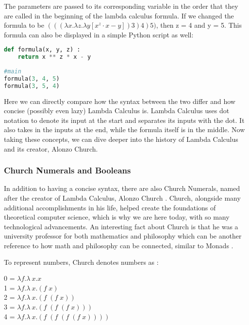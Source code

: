 \documentclass{article}
\begin{document}
\noindent
The parameters are passed to its corresponding variable in the order that they are called in the beginning of the lambda calculus formula. If we changed the formula to be $(((\lambda x.\lambda z.\lambda y [x^z \cdot x-y])3)4)5)$, then z = 4 and y = 5. This formula can also be displayed in a simple Python script as well:

\begin{lstlisting}[language=Python]
def formula(x, y, z) :
    return x ** z * x - y
    
#main
formula(3, 4, 5)
formula(3, 5, 4)
\end{lstlisting}

\noindent
Here we can directly compare how the syntax between the two differ and how concise (possibly even lazy) Lambda Calculus is. Lambda Calculus uses dot notation to denote its input at the start and separates its inputs with the dot. It also takes in the inputs at the end, while the formula itself is in the middle. Now taking these concepts, we can dive deeper into the history of Lambda Calculus and its creator, Alonzo Church.

\subsubsection{Church Numerals and Booleans}

In addition to having a concise syntax, there are also Church Numerals, named after the creator of Lambda Calculus, Alonzo Church \cite{Lambda Calculus}. Church, alongside many additional accomplishments in his life, helped create the foundations of theoretical computer science, which is why we are here today, with so many technological advancements. An interesting fact about Church is that he was a university professor for both mathematics and philosophy which can be another reference to how math and philosophy can be connected, similar to Monads \cite{NAS}.  

\medskip\noindent
To represent numbers, Church denotes numbers as \cite{CN}:

\begin{center}
    0 = $\lambda f. \lambda\ x.x$ \\
    1 = $\lambda f. \lambda\ x.(f \; x)$ \\
    2 = $\lambda f. \lambda\ x.(f \; (f \; x))$ \\
    3 = $\lambda f. \lambda\ x.(f \; (f \; (f \; x)))$ \\
    4 = $\lambda f. \lambda\ x.(f \; (f \; (f \; (f \; x))))$ \\
\end{center}
\end{document}
